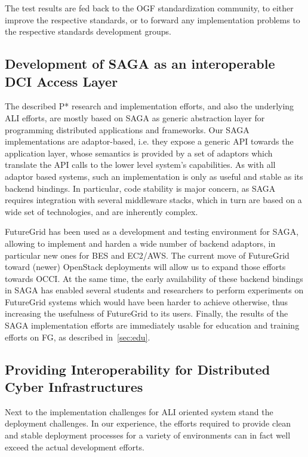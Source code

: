 \documentclass[]{paper}
\begin{document}
 The test results are fed back to the OGF standardization community,
 to either improve the respective standards, or to forward any
 implementation problems to the respective standards development
 groups.


\subsection*{Development of SAGA as an interoperable DCI Access Layer}
\label{ssec:std_saga}

 The described P* research and implementation efforts, and also the
 underlying ALI efforts, are mostly based on SAGA as generic
 abstraction layer for programming distributed applications and
 frameworks.  Our SAGA implementations are adaptor-based, i.e. they
 expose a generic API towards the application layer, whose semantics
 is provided by a set of adaptors which translate the API calls to the
 lower level system's capabilities.  As with all adaptor based
 systems, such an implementation is only as useful and stable as its
 backend bindings.  In particular, code stability is major concern, as
 SAGA requires integration with several middleware stacks, which in
 turn are based on a wide set of technologies, and are inherently
 complex.

 FutureGrid has been used as a development and testing environment for
 SAGA, allowing to implement and harden a wide number of backend
 adaptors, in particular new ones for BES and EC2/AWS.  The current
 move of FutureGrid toward (newer) OpenStack deployments will allow us
 to expand those efforts towards OCCI.  At the same time, the early
 availability of these backend bindings in SAGA has enabled several
 students and researchers to perform experiments on FutureGrid systems
 which would have been harder to achieve otherwise, thus increasing
 the usefulness of FutureGrid to its users.  Finally, the results of
 the SAGA implementation efforts are immediately usable for education
 and training efforts on FG, as described in~\ref{sec:edu}.


\subsection*{Providing Interoperability for Distributed Cyber Infrastructures}
\label{ssec:std_xsede}

 Next to the implementation challenges for ALI oriented system stand
 the deployment challenges.  In our experience, the efforts
 required to provide clean and stable deployment processes for
 a variety of environments can in fact well exceed the actual development
 efforts.
\end{document}
